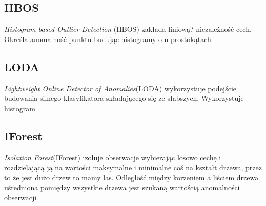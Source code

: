 \subsection{HBOS}
\textit{Histogram-based Outlier Detection} (HBOS) \cite{hbos} zakłada liniową? niezależność cech. Określa anomalność punktu budując histogramy o n prostokątach

\subsection{LODA}
\textit{Lightweight Online Detector of Anomalies}(LODA) \cite{loda} wykorzystuje podejście budowania silnego klasyfikatora składającego się ze słabszych. Wykorzystuje histogram

\subsection{IForest}
\textit{Isolation Forest}(IForest) \cite{iforest} izoluje obserwacje wybierając losowo cechę i rozdzielającą ją na wartości maksymalne i minimalne coś na kształt drzewa, przez to że jest dużo drzew to mamy las. Odległość między korzeniem a liściem drzewa uśredniona pomiędzy wszystkie drzewa jest szukaną wartością anomalności obserwacji
\label{sub:IF}
